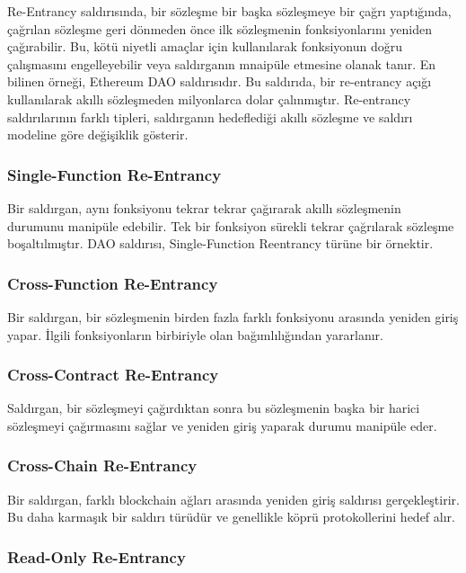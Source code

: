 Re-Entrancy saldırısında, bir sözleşme bir başka sözleşmeye bir çağrı yaptığında, çağrılan sözleşme geri dönmeden önce ilk sözleşmenin fonksiyonlarını yeniden çağırabilir. Bu, kötü niyetli amaçlar için kullanılarak fonksiyonun doğru çalışmasını engelleyebilir veya saldırganın mnaipüle etmesine olanak tanır. En bilinen örneği, Ethereum DAO saldırısıdır. Bu saldırıda, bir re-entrancy açığı kullanılarak akıllı sözleşmeden milyonlarca dolar çalınmıştır. Re-entrancy saldırılarının farklı tipleri, saldırganın hedeflediği akıllı sözleşme ve saldırı modeline göre değişiklik gösterir.

\subsubsection{Single-Function Re-Entrancy}

Bir saldırgan, aynı fonksiyonu tekrar tekrar çağırarak akıllı sözleşmenin durumunu manipüle edebilir. Tek bir fonksiyon sürekli tekrar çağrılarak sözleşme boşaltılmıştır. DAO saldırısı, Single-Function Reentrancy türüne bir örnektir.

\subsubsection{Cross-Function Re-Entrancy}

Bir saldırgan, bir sözleşmenin birden fazla farklı fonksiyonu arasında yeniden giriş yapar. İlgili fonksiyonların birbiriyle olan bağımlılığından yararlanır.

\subsubsection{Cross-Contract Re-Entrancy}

Saldırgan, bir sözleşmeyi çağırdıktan sonra bu sözleşmenin başka bir harici sözleşmeyi çağırmasını sağlar ve yeniden giriş yaparak durumu manipüle eder.

\subsubsection{Cross-Chain Re-Entrancy}

Bir saldırgan, farklı blockchain ağları arasında yeniden giriş saldırısı gerçekleştirir. Bu daha karmaşık bir saldırı türüdür ve genellikle köprü protokollerini hedef alır.

\subsubsection{Read-Only Re-Entrancy}


